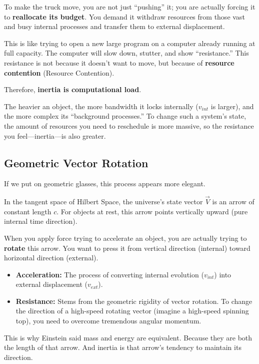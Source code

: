 To make the truck move, you are not just ``pushing'' it; you are actually forcing it to \textbf{reallocate its budget}. You demand it withdraw resources from those vast and busy internal processes and transfer them to external displacement.

This is like trying to open a new large program on a computer already running at full capacity. The computer will slow down, stutter, and show ``resistance.'' This resistance is not because it doesn't want to move, but because of \textbf{resource contention} (Resource Contention).

Therefore, \textbf{inertia is computational load}.

The heavier an object, the more bandwidth it locks internally ($v_{int}$ is larger), and the more complex its ``background processes.'' To change such a system's state, the amount of resources you need to reschedule is more massive, so the resistance you feel---inertia---is also greater.

\subsection{Geometric Vector Rotation}

If we put on geometric glasses, this process appears more elegant.

In the tangent space of Hilbert Space, the universe's state vector $\vec{V}$ is an arrow of constant length $c$. For objects at rest, this arrow points vertically upward (pure internal time direction).

When you apply force trying to accelerate an object, you are actually trying to \textbf{rotate} this arrow. You want to press it from vertical direction (internal) toward horizontal direction (external).

\begin{itemize}
\item \textbf{Acceleration:} The process of converting internal evolution ($v_{int}$) into external displacement ($v_{ext}$).

\item \textbf{Resistance:} Stems from the geometric rigidity of vector rotation. To change the direction of a high-speed rotating vector (imagine a high-speed spinning top), you need to overcome tremendous angular momentum.
\end{itemize}

This is why Einstein said mass and energy are equivalent. Because they are both the length of that arrow. And inertia is that arrow's tendency to maintain its direction.

